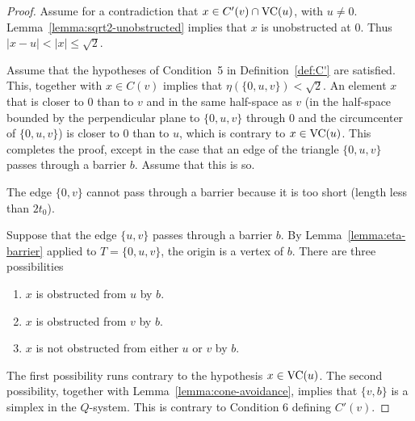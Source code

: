 \begin{proof}
Assume for a contradiction that $x\in C'(v)\cap {\operatorname{VC}}(u)$, with
$u\ne 0$. Lemma~\ref{lemma:sqrt2-unobstructed} implies that $x$ is
unobstructed at $0$.  Thus $|x-u|<|x|\le\sqrt2$.

Assume that the hypotheses of Condition~5 in Definition~\ref{def:C'} are
satisfied.
This, together
with $x\in C(v)$ implies that $\eta(\{0,u,v\})<\sqrt2$. An element
$x$ that is closer to $0$ than to $v$ and in the same half-space
as $v$ (in the half-space bounded by the perpendicular plane to
$\{0,u,v\}$ through $0$ and the circumcenter of $\{0,u,v\}$) is
closer to $0$ than to $u$, which is contrary to $x\in{\operatorname{VC}}(u)$.
This completes the proof, except in the case that an edge of the
triangle $\{0,u,v\}$ passes through a barrier $b$. Assume that
this is so.

The edge $\{0,v\}$ cannot pass through a barrier because it is too
short (length less than $2t_0$).

Suppose that the edge $\{u,v\}$ passes through a barrier $b$.  By
Lemma~\ref{lemma:eta-barrier} applied to $T=\{0,u,v\}$, the origin
is  a vertex of $b$.  There are three possibilities
   \begin{enumerate}
   \item $x$ is obstructed from $u$ by $b$.
   \item $x$ is obstructed from $v$ by $b$.
   \item $x$ is not obstructed from either $u$ or $v$ by $b$.
   \end{enumerate}
The first possibility runs contrary to the hypothesis
$x\in{\operatorname{VC}}(u)$.
The second possibility, together with
Lemma~\ref{lemma:cone-avoidance}, implies that $\{v,b\}$ is a
simplex in the $Q$-system. This is contrary to Condition 6
defining $C'(v)$.


\end{proof}
